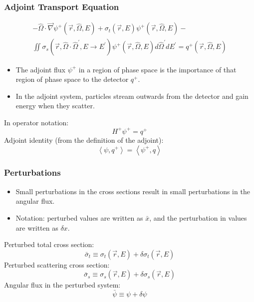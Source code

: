 \documentclass[t]{beamer}
\begin{document}
\begin{frame}
  \frametitle{Adjoint Transport Equation}
  \begin{multline}
    -\hat{\Omega}\cdot\vec{\nabla}\psi^+\left(\vec{r},\hat{\Omega},E\right) +
    \sigma_t\left(\vec{r},E\right)\psi^+\left(\vec{r},\hat{\Omega},E\right) - \\
    \iint\sigma_s\left(\vec{r},\hat{\Omega}\cdot\hat{\Omega}^\prime,E\rightarrow E^\prime\right)\psi^+\left(\vec{r},\hat{\Omega},E\right)d\hat{\Omega}^\prime dE^\prime =
    q^+\left(\vec{r},\hat{\Omega},E\right)
  \end{multline}
  \begin{itemize}
    \item The adjoint flux $\psi^+$ in a region of phase space is the importance
          of that region of phase space to the detector $q^+$.
    \item In the adjoint system, particles stream outwards from the detector and
          gain energy when they scatter.
  \end{itemize}
  In operator notation:
  \begin{equation}
    H^+\psi^+ = q^+
  \end{equation}
  Adjoint identity (from the definition of the adjoint):
  \begin{equation}
    \left<\psi,q^+\right> = \left<\psi^+,q\right>
  \end{equation}
\end{frame}

\begin{frame}
  \frametitle{Perturbations}
  \begin{itemize}
    \item Small perturbations in the cross sections result in small
          perturbations in the angular flux.
    \item Notation: perturbed values are written as $\bar{x}$, and
          the perturbation in values are written as $\delta x$.
  \end{itemize}
  Perturbed total cross section:
  \begin{equation}
    \bar{\sigma}_t \equiv
    \sigma_t\left(\vec{r},E\right) + \delta\sigma_t\left(\vec{r},E\right)
  \end{equation}
  Perturbed scattering cross section:
  \begin{equation}
    \bar{\sigma}_s \equiv
    \sigma_s\left(\vec{r},E\right) + \delta\sigma_s\left(\vec{r},E\right)
  \end{equation}
  Angular flux in the perturbed system:
  \begin{equation}
    \bar{\psi} \equiv \psi + \delta\psi
  \end{equation}
\end{frame}
\end{document}
